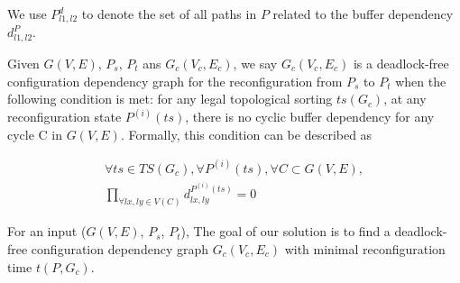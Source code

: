 We use $P^d_{l1,l2}$ to denote the set of all paths in $P$ related to the buffer dependency $d_{l1,l2}^P$.

Given $G(V,E)$, $P_s$, $P_t$ ans $G_c(V_c,E_c)$,  we say $G_c(V_c,E_c)$ is a deadlock-free configuration dependency graph for the  reconfiguration from $P_s$ to $P_t$ when the following condition is met: for any legal topological sorting $ts(G_c)$, at any reconfiguration state ${P^{(i)}(ts)}$, there is no cyclic buffer dependency for any cycle C in $G(V,E)$.  Formally, this condition can be described as

\begin{equation}  \label{eq:1}
\begin{split}
 \forall ts \in TS(G_c), \forall P^{(i)}(ts), \forall C \subset G(V,E), \\
 \displaystyle{\prod\limits_{\forall lx, ly \in V(C)} d_{lx,ly}^{P^{(i)}(ts)} =0}
 \end{split}
\end{equation} 

For an input ($G(V,E)$, $P_s$, $P_t$), The goal of our solution is to find a deadlock-free configuration dependency graph $G_c(V_c,E_c)$ with minimal reconfiguration time $t(P, G_c)$.
%  

% 
%  


%
%

